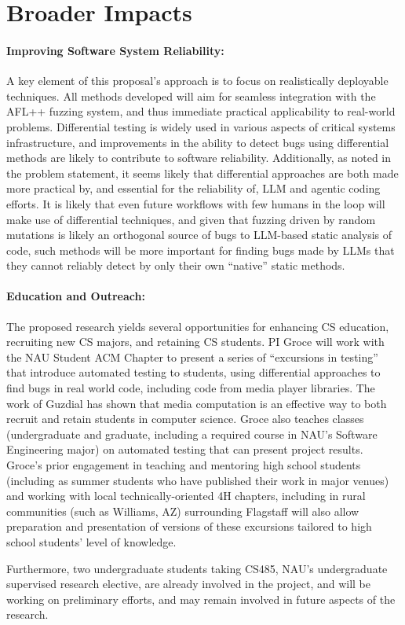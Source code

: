 \section{Broader Impacts}

\paragraph{Improving Software System Reliability:} A key element of
this proposal's approach is to focus on realistically deployable
techniques.  All methods developed will aim for seamless integration
with the AFL++ fuzzing system, and thus immediate practical
applicability to real-world problems.  Differential testing is widely
used in various aspects of critical systems infrastructure, and
improvements in the ability to detect bugs using differential methods
are likely to contribute to software reliability.  Additionally, as
noted in the problem statement, it seems likely that differential
approaches are both made more practical by, and essential for the
reliability of, LLM and agentic coding efforts.  It is likely that
even future workflows with few humans in the loop will make use of
differential techniques, and given that fuzzing driven by random
mutations is likely an orthogonal source of bugs to LLM-based static
analysis of code, such methods will be more important for finding bugs
made by LLMs that they cannot reliably detect by only their own
``native'' static methods.

\paragraph{Education and Outreach:}
The proposed research yields several opportunities for enhancing CS
education, recruiting new CS majors, and retaining CS students.  PI Groce will work with the NAU Student ACM Chapter to
present a series of ``excursions in testing'' that introduce automated
testing to students, using differential approaches to find bugs in real world code,
including code from media player libraries.  The
work of Guzdial \cite{Guzdial} has shown that media computation is an
effective way to both recruit and retain students in computer science. Groce also teaches
classes (undergraduate and graduate, including a required course in
NAU's Software Engineering major) on automated testing that can
present project results.  Groce's prior
engagement in teaching and mentoring high school students (including
as summer students who have published their work in major venues) and working with
local technically-oriented 4H chapters, including in rural communities
(such as Williams, AZ) surrounding Flagstaff will also allow
preparation and presentation of versions of these excursions tailored
to high school students' level of knowledge.

Furthermore, two undergraduate students taking CS485, NAU's
undergraduate supervised research elective, are already involved in
the project, and will be working on preliminary efforts, and may
remain involved in future aspects of the research.